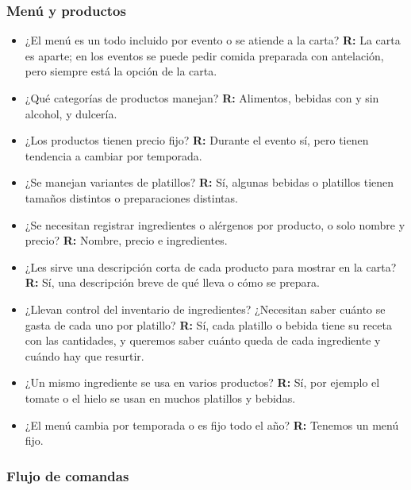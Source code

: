 \subsubsection{Menú y productos}

\begin{itemize}
    \item ¿El menú es un todo incluido por evento o se atiende a la carta?
    \subitem \textbf{R:} La carta es aparte; en los eventos se puede pedir comida preparada con antelación, pero siempre está la opción de la carta.

    \item ¿Qué categorías de productos manejan?
    \subitem \textbf{R:} Alimentos, bebidas con y sin alcohol, y dulcería.

    \item ¿Los productos tienen precio fijo?
    \subitem \textbf{R:} Durante el evento sí, pero tienen tendencia a cambiar por temporada.

    \item ¿Se manejan variantes de platillos?
    \subitem \textbf{R:} Sí, algunas bebidas o platillos tienen tamaños distintos o preparaciones distintas.

    \item ¿Se necesitan registrar ingredientes o alérgenos por producto, o solo nombre y precio?
    \subitem \textbf{R:} Nombre, precio e ingredientes.

    \item ¿Les sirve una descripción corta de cada producto para mostrar en la carta?
    \subitem \textbf{R:} Sí, una descripción breve de qué lleva o cómo se prepara.

    \item ¿Llevan control del inventario de ingredientes? ¿Necesitan saber cuánto se gasta de cada uno por platillo?
    \subitem \textbf{R:} Sí, cada platillo o bebida tiene su receta con las cantidades, y queremos saber cuánto queda de cada ingrediente y cuándo hay que resurtir.

    \item ¿Un mismo ingrediente se usa en varios productos?
    \subitem \textbf{R:} Sí, por ejemplo el tomate o el hielo se usan en muchos platillos y bebidas.

    \item ¿El menú cambia por temporada o es fijo todo el año?
    \subitem \textbf{R:} Tenemos un menú fijo.
\end{itemize}

\subsubsection{Flujo de comandas}

